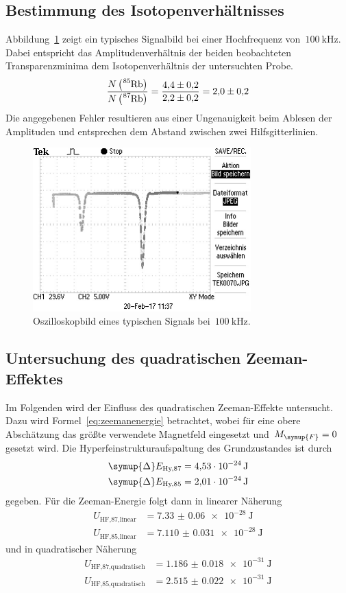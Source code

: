 \subsection{Bestimmung des Isotopenverhältnisses}
Abbildung~\ref{fig:signalbild} zeigt ein typisches Signalbild bei einer
Hochfrequenz von~$\SI{100}{\kilo\hertz}$. Dabei entspricht das
Amplitudenverhältnis der beiden beobachteten Transparenzminima dem
Isotopenverhältnis der untersuchten Probe.
%
\begin{equation}
  \frac{N\left(\ce{^85Rb}\right)}{N\left(\ce{^87Rb}\right)}
  =\frac{\num{4.4(2)}}{\num{2.2(2)}}
  =\num{2.0(2)}
\end{equation}
%
Die angegebenen Fehler resultieren aus einer Ungenauigkeit beim Ablesen der
Amplituden und entsprechen dem Abstand zwischen zwei Hilfsgitterlinien.
%
\begin{figure}[htb]
  \centering
  \includegraphics[width=0.75\textwidth]{analysis/signalbild.png}
  \caption{Oszilloskopbild eines typischen Signals
  bei~$\SI{100}{\kilo\hertz}$.}
  \label{fig:signalbild}
\end{figure}
%
\subsection{Untersuchung des quadratischen Zeeman-Effektes}
Im Folgenden wird der Einfluss des quadratischen Zeeman-Effekte untersucht. Dazu
wird Formel~\eqref{eq:zeemanenergie} betrachtet, wobei für eine obere
Abschätzung das größte verwendete Magnetfeld eingesetzt und~$M_{\symup{F}}=0$
gesetzt wird. Die Hyperfeinstrukturaufspaltung des Grundzustandes ist durch
%
\begin{align}
  \symup{\Delta}E_{\text{Hy,87}}&=\SI{4.53e-24}{\joule} \\
  \symup{\Delta}E_{\text{Hy,85}}&=\SI{2.01e-24}{\joule}
\end{align}
%
gegeben. Für die Zeeman-Energie folgt dann in linearer Näherung
%
\begin{align}
  U_{\text{HF,87,linear}}&=\SI{7.33(6)e-28}{\joule} \\
  U_{\text{HF,85,linear}}&=\SI{7.110(31)e-28}{\joule}
\end{align}
%
und in quadratischer Näherung
%
\begin{align}
  U_{\text{HF,87,quadratisch}}&=\SI{1.186(18)e-31}{\joule} \\
  U_{\text{HF,85,quadratisch}}&=\SI{2.515(22)e-31}{\joule}
\end{align}
%
